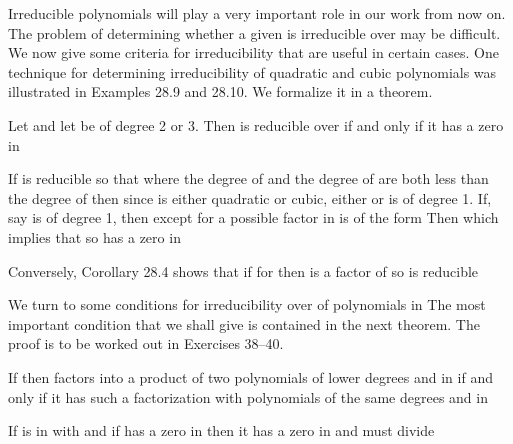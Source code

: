 \documentclass[11pt,oneside]{article}
\begin{document}
\begin{BookBody}
Irreducible polynomials will play a very important role in our work from now on. The problem of determining whether a given  is irreducible over  may be difficult. We now give some criteria for irreducibility that are useful in certain cases. One technique for determining irreducibility of quadratic and cubic polynomials was illustrated in Examples 28.9 and 28.10. We formalize it in a theorem.

 Let  and let  be of degree 2 or 3. Then  is reducible over  if and only if it has a zero in 

 If  is reducible so that  where the degree of  and the degree of  are both less than the degree of  then since  is either quadratic or cubic, either  or  is of degree 1. If, say is of degree 1, then except for a possible factor in  is of the form  Then  which implies that  so  has a zero in 

Conversely, Corollary 28.4 shows that if  for  then  is a factor of  so  is reducible\BookEnd{\blacklozenge}

We turn to some conditions for irreducibility over  of polynomials in  The most important condition that we shall give is contained in the next theorem. The proof is to be worked out in Exercises 38–40.

 If  then  factors into a product of two polynomials of lower degrees  and  in  if and only if it has such a factorization with polynomials of the same degrees  and  in \BookEnd{\blacklozenge}

 If  is in  with  and if  has a zero in  then it has a zero  in  and  must divide 


\end{BookBody}
\end{document}
